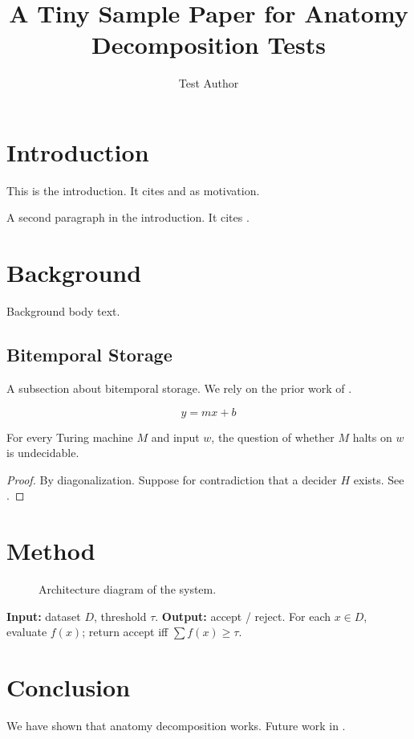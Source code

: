 \documentclass{article}
\title{A Tiny Sample Paper for Anatomy Decomposition Tests}
\author{Test Author}
\begin{document}
\maketitle

\section{Introduction}

This is the introduction. It cites \cite{foo23} and \cite{bar22}
as motivation.

A second paragraph in the introduction. It cites \cite{baz21}.

\section{Background}

Background body text.

\subsection{Bitemporal Storage}

A subsection about bitemporal storage.
We rely on the prior work of \cite{snodgrass95}.

\begin{equation}
\label{eqn:basic}
y = mx + b
\end{equation}

\begin{theorem}
\label{thm:halting}
For every Turing machine $M$ and input $w$, the question of
whether $M$ halts on $w$ is undecidable.
\end{theorem}

\begin{proof}
By diagonalization. Suppose for contradiction that a decider $H$
exists. See \cite{turing36}.
\end{proof}

\section{Method}

\begin{figure}
\label{fig:arch}
\caption{Architecture diagram of the system.}
\end{figure}

\begin{table}
\label{tbl:perf}
\caption{Performance comparison across benchmarks.}
\end{table}

\begin{algorithm}
\label{alg:probe}
\caption{Probe routine.}
\textbf{Input:} dataset $D$, threshold $\tau$.
\textbf{Output:} accept / reject.
For each $x \in D$, evaluate $f(x)$; return accept iff
$\sum f(x) \geq \tau$.
\end{algorithm}

\section{Conclusion}

We have shown that anatomy decomposition works. Future work in
\cite{future26}.
\end{document}
